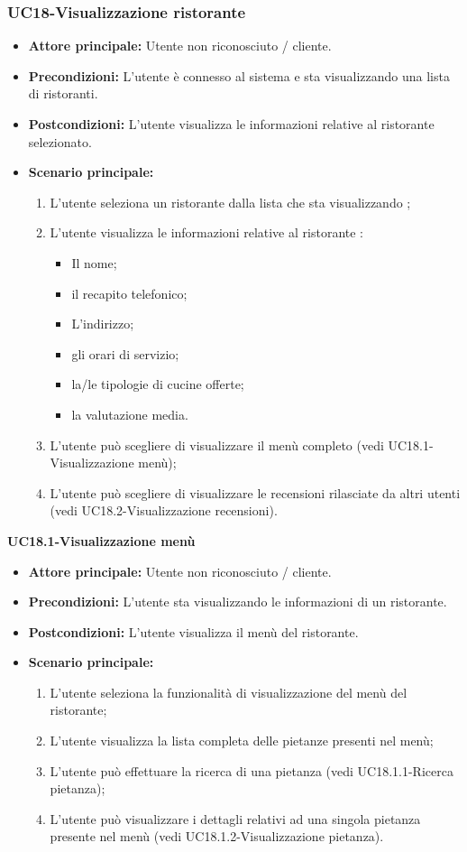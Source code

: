 \subsubsection{UC18-Visualizzazione ristorante}
\begin{itemize}
\item \textbf{Attore principale:} Utente non riconosciuto / cliente.
\item \textbf{Precondizioni:} L'utente è connesso al sistema e sta visualizzando una lista di ristoranti.
\item \textbf{Postcondizioni:} L'utente visualizza le informazioni relative al ristorante selezionato.
\item \textbf{Scenario principale:}
\begin{enumerate}
    \item L'utente seleziona un ristorante dalla lista che sta visualizzando ;
    \item L'utente visualizza le informazioni relative al ristorante :
    \begin{itemize}
        \item Il nome;
        \item il recapito telefonico;
        \item L'indirizzo;
        \item gli orari di servizio;
        \item la/le tipologie di cucine offerte;
        \item la valutazione media.
    \end{itemize}
    \item L'utente può scegliere di visualizzare il menù completo (vedi UC18.1-Visualizzazione menù);
    \item L'utente può scegliere di visualizzare le recensioni rilasciate da altri utenti (vedi UC18.2-Visualizzazione recensioni).
\end{enumerate}
\end{itemize}

\textbf{UC18.1-Visualizzazione menù}
\begin{itemize}
\item \textbf{Attore principale:} Utente non riconosciuto / cliente.
\item \textbf{Precondizioni:} L'utente sta visualizzando le informazioni di un ristorante.
\item \textbf{Postcondizioni:} L'utente visualizza il menù del ristorante.
\item \textbf{Scenario principale:}
\begin{enumerate}
    \item L'utente seleziona la funzionalità di visualizzazione del menù del ristorante;
    \item L'utente visualizza la lista completa delle pietanze presenti nel menù;
    \item L'utente può effettuare la ricerca di una pietanza (vedi UC18.1.1-Ricerca pietanza);
    \item L'utente può visualizzare i dettagli relativi ad una singola pietanza presente
     nel menù (vedi UC18.1.2-Visualizzazione pietanza).
\end{enumerate}
\end{itemize}

